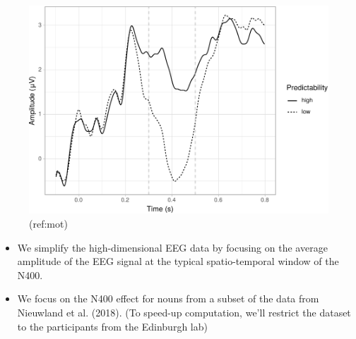 \documentclass[12pt,ignorenonframetext,aspectratio=169]{beamer}
\providecommand{\tightlist}{%
  \setlength{\itemsep}{0pt}\setlength{\parskip}{0pt}}
\begin{document}
\begin{frame}

\small

\begin{figure}

{\centering \includegraphics[width=0.8\linewidth]{cc_figure/N400noun-1} 

}

\caption{(ref:mot)}\label{fig:mot}
\end{figure}

\normalsize

\end{frame}

\begin{frame}

\begin{itemize}
\tightlist
\item
  We simplify the high-dimensional EEG data by focusing on the average amplitude of the EEG signal at the typical spatio-temporal window of the N400.
\item
  We focus on the N400 effect for nouns from a subset of the data from Nieuwland et al. (2018). (To speed-up computation, we'll restrict the dataset to the participants from the Edinburgh lab)
\end{itemize}

\end{frame}
\end{document}
